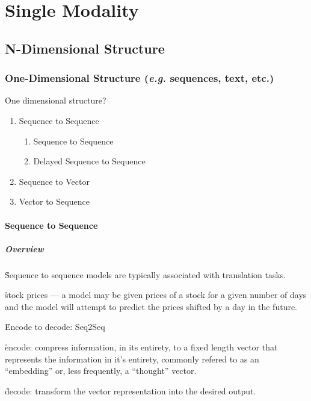 \section{Single Modality}

\subsection{N-Dimensional Structure}

\subsubsection{One-Dimensional Structure (\textit{e.g.} sequences, text, etc.)}

\r{One dimensional structure?}

\begin{enumerate}[noitemsep,topsep=0pt]
	\item Sequence to Sequence
	\begin{enumerate}[noitemsep,topsep=0pt]
		\item Sequence to Sequence
		\item Delayed Sequence to Sequence
	\end{enumerate}
	\item Sequence to Vector
	\item Vector to Sequence
\end{enumerate}


\paragraph{Sequence to Sequence}

\subparagraph{Overview}


\r{Sequence to sequence models are typically associated with translation tasks.}

\r{stock prices --- a model may be given prices of a stock for a given number of days and the model will attempt to predict the prices shifted by a day in the future.}


\r{Encode to decode: Seq2Seq\cite{DBLP:journals/corr/SutskeverVL14}}

\r{encode: compress information, in its entirety, to a fixed length vector that represents the information in it's entirety, commonly refered to as an ``embedding'' or, less frequently, a ``thought'' vector.}

\r{decode: transform the vector representation into the desired output.}

